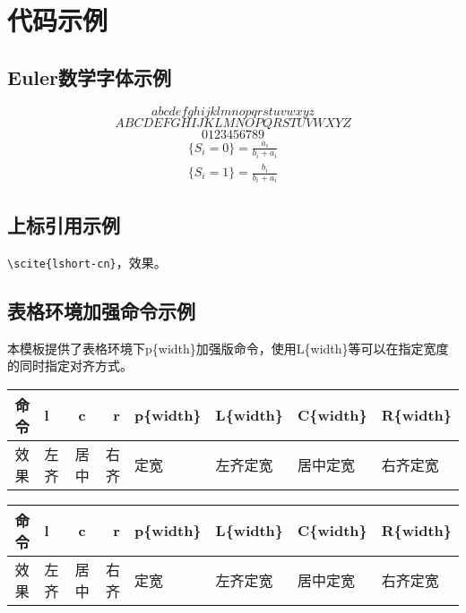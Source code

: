 ﻿
\chapter{代码示例}
\label{chap:example}
\section{Euler数学字体示例}
$$
abcdefghijklmnopqrstuvwxyz
$$
$$
ABCDEFGHIJKLMNOPQRSTUVWXYZ
$$
$$
0123456789
$$
\begin{equation}
\begin{split}
\{S_i=0\}=\frac{a_i}{b_i+a_i} \\
\{S_i=1\}=\frac{b_i}{b_i+a_i} \label{1}
\end{split}
\end{equation}

\section{上标引用示例}
\verb|\scite{lshort-cn}|，效果。

\section{表格环境加强命令示例}
本模板提供了表格环境下p\{width\}加强版命令，使用L\{width\}等可以在指定宽度的同时指定对齐方式。

\begin{minipage}{\textwidth}
\begin{Codex}[numbers=left]
\begin{table}
\label{tab:tblcmp}
\centering
\begin{tabular}{c||l|c|r|p{2.5cm}|L{2.5cm}|C{2.5cm}|R{2.5cm}}
\hline
命令&l&c&r&p\{width\}&L\{width\}&C\{width\}&R\{width\}\\
\hline
效果&左齐&居中&右齐&定宽&左齐定宽&居中定宽&右齐定宽\\
\hline
\end{tabular}
\end{table}
\end{Codex}

\label{tab:tblcmp}
\centering
\begin{tabular}{c||l|c|r|p{2.5cm}|L{2.5cm}|C{2.5cm}|R{2.5cm}}
\hline
命令&l&c&r&p\{width\}&L\{width\}&C\{width\}&R\{width\}\\
\hline
效果&左齐&居中&右齐&定宽&左齐定宽&居中定宽&右齐定宽\\
\hline
\end{tabular}
\end{minipage}

